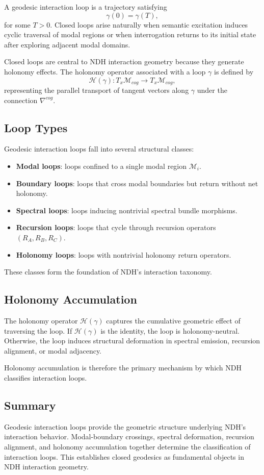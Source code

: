 A geodesic interaction loop is a trajectory satisfying
\[
\gamma(0) = \gamma(T),
\]
for some $T > 0$. Closed loops arise naturally when semantic excitation induces
cyclic traversal of modal regions or when interrogation returns to its initial
state after exploring adjacent modal domains.

Closed loops are central to NDH interaction geometry because they generate
holonomy effects. The holonomy operator associated with a loop $\gamma$ is
defined by
\[
\mathcal{H}(\gamma) : T_x \mathcal{M}_{cog} \to T_x \mathcal{M}_{cog},
\]
representing the parallel transport of tangent vectors along $\gamma$ under the
connection $\nabla^{cog}$.

\subsection{Loop Types}

Geodesic interaction loops fall into several structural classes:

\begin{itemize}
    \item \textbf{Modal loops}: loops confined to a single modal region
    $\mathcal{M}_i$.
    \item \textbf{Boundary loops}: loops that cross modal boundaries but return
    without net holonomy.
    \item \textbf{Spectral loops}: loops inducing nontrivial spectral bundle
    morphisms.
    \item \textbf{Recursion loops}: loops that cycle through recursion operators
    $(R_A, R_B, R_C)$.
    \item \textbf{Holonomy loops}: loops with nontrivial holonomy return
    operators.
\end{itemize}

These classes form the foundation of NDH's interaction taxonomy.

\subsection{Holonomy Accumulation}

The holonomy operator $\mathcal{H}(\gamma)$ captures the cumulative geometric
effect of traversing the loop. If $\mathcal{H}(\gamma)$ is the identity, the
loop is holonomy-neutral. Otherwise, the loop induces structural deformation in
spectral emission, recursion alignment, or modal adjacency.

Holonomy accumulation is therefore the primary mechanism by which NDH
classifies interaction loops.

\subsection{Summary}

Geodesic interaction loops provide the geometric structure underlying NDH's
interaction behavior. Modal-boundary crossings, spectral deformation, recursion
alignment, and holonomy accumulation together determine the classification of
interaction loops. This establishes closed geodesics as fundamental objects in
NDH interaction geometry.
